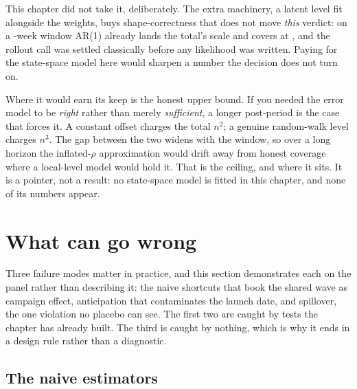 This chapter did not take it, deliberately. The extra machinery, a latent level fit alongside the
weights, buys shape-correctness that does not move \emph{this} verdict: on a \nbSevenNPost-week window
AR(1) already lands the total's scale and covers at \pc{\nbSevenTotalCovArone}, and the rollout call
was settled classically before any likelihood was written. Paying for the state-space model here
would sharpen a number the decision does not turn on.

Where it would earn its keep is the honest upper bound. If you needed the error model to be
\emph{right} rather than merely \emph{sufficient}, a longer post-period is the case that forces it.
A constant offset charges the total $n^2$; a genuine random-walk level charges $n^3$. The gap between
the two widens with the window, so over a long horizon the inflated-$\rho$ approximation would drift
away from honest coverage where a local-level model would hold it. That is the ceiling, and where it
sits. It is a pointer, not a result: no state-space model is fitted in this chapter, and none of its
numbers appear.

\section{What can go wrong}
\label{sec:sc:wrong}

Three failure modes matter in practice, and this section demonstrates each on the panel rather than
describing it: the naive shortcuts that book the shared wave as campaign effect, anticipation that
contaminates the launch date, and spillover, the one violation no placebo can see. The first two are
caught by tests the chapter has already built. The third is caught by nothing, which is why it ends
in a design rule rather than a diagnostic.

\subsection*{The naive estimators}

